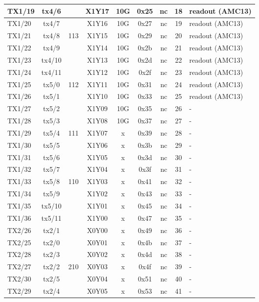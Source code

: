 \begin{longtable}{|l|c|c|c|c|c|c|c|l|}
TX1/19 & tx4/6  &     & X1Y17 & 10G & 0x25 & nc & 18 & readout (AMC13)\\\hline
TX1/20 & tx4/7  &     & X1Y16 & 10G & 0x27 & nc & 19 & readout (AMC13)\\\hline
TX1/21 & tx4/8  & 113 & X1Y15 & 10G & 0x29 & nc & 20 & readout (AMC13)\\\hline
TX1/22 & tx4/9  &     & X1Y14 & 10G & 0x2b & nc & 21 & readout (AMC13)\\\hline
TX1/23 & tx4/10 &     & X1Y13 & 10G & 0x2d & nc & 22 & readout (AMC13)\\\hline
TX1/24 & tx4/11 &     & X1Y12 & 10G & 0x2f & nc & 23 & readout (AMC13)\\\hline
TX1/25 & tx5/0  & 112 & X1Y11 & 10G & 0x31 & nc & 24 & readout (AMC13)\\\hline
TX1/26 & tx5/1  &     & X1Y10 & 10G & 0x33 & nc & 25 & readout (AMC13)\\\hline
TX1/27 & tx5/2  &     & X1Y09 & 10G & 0x35 & nc & 26 & -\\\hline
TX1/28 & tx5/3  &     & X1Y08 & 10G & 0x37 & nc & 27 & -\\\hline
TX1/29 & tx5/4  & 111 & X1Y07 &  x  & 0x39 & nc & 28 & -\\\hline
TX1/30 & tx5/5  &     & X1Y06 &  x  & 0x3b & nc & 29 & -\\\hline
TX1/31 & tx5/6  &     & X1Y05 &  x  & 0x3d & nc & 30 & -\\\hline
TX1/32 & tx5/7  &     & X1Y04 &  x  & 0x3f & nc & 31 & -\\\hline
TX1/33 & tx5/8  & 110 & X1Y03 &  x  & 0x41 & nc & 32 & -\\\hline
TX1/34 & tx5/9  &     & X1Y02 &  x  & 0x43 & nc & 33 & -\\\hline
TX1/35 & tx5/10 &     & X1Y01 &  x  & 0x45 & nc & 34 & -\\\hline
TX1/36 & tx5/11 &     & X1Y00 &  x  & 0x47 & nc & 35 & -\\\hline
TX2/26 & tx2/1  &     & X0Y00 &  x  & 0x49 & nc & 36 & -\\\hline
TX2/25 & tx2/0  &     & X0Y01 &  x  & 0x4b & nc & 37 & -\\\hline
TX2/28 & tx2/3  &     & X0Y02 &  x  & 0x4d & nc & 38 & -\\\hline
TX2/27 & tx2/2  & 210 & X0Y03 &  x  & 0x4f & nc & 39 & -\\\hline
TX2/30 & tx2/5  &     & X0Y04 &  x  & 0x51 & nc & 40 & -\\\hline
TX2/29 & tx2/4  &     & X0Y05 &  x  & 0x53 & nc & 41 & -\\\hline

\end{longtable}
